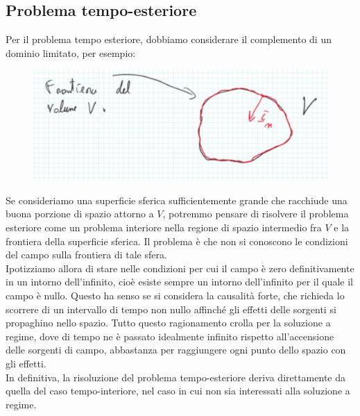 \documentclass{book}
\begin{document}
        \subsection{Problema tempo-esteriore}
            Per il problema tempo esteriore, dobbiamo considerare il complemento di un dominio limitato, per esempio:
            \begin{figure}[h!]
                \centering
                \includegraphics[width=0.5\linewidth]{img//Chapter_one/Chapt1img8.png}
            \end{figure}
        Se consideriamo una superficie sferica sufficientemente grande che racchiude una buona porzione di spazio attorno a $V$, potremmo pensare di risolvere il problema esteriore come un problema interiore nella regione di spazio intermedio fra $V$ e la frontiera della superficie sferica. Il problema è che non si conoscono le condizioni del campo sulla frontiera di tale sfera. \\
        Ipotizziamo allora di stare nelle condizioni per cui il campo è zero definitivamente in un intorno dell'infinito, cioè esiste sempre un intorno dell'infinito per il quale il campo è nullo. Questo ha senso se si considera la causalità forte, che richieda lo scorrere di un intervallo di tempo non nullo affinché gli effetti delle sorgenti si propaghino nello spazio. Tutto questo ragionamento crolla per la soluzione a regime, dove di tempo ne è passato idealmente infinito rispetto all'accensione delle sorgenti di campo, abbastanza per raggiungere ogni punto dello spazio con gli effetti. \\ 
        In definitiva, la risoluzione del problema tempo-esteriore deriva direttamente da quella del caso tempo-interiore, nel caso in cui non sia interessati alla soluzione a regime.
\end{document}
